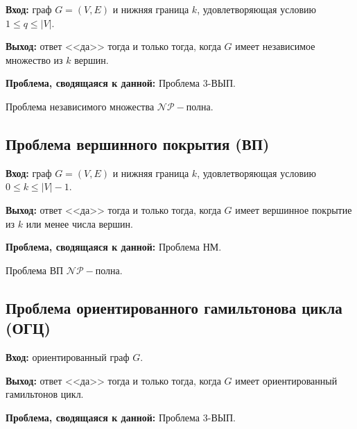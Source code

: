 \textbf{Вход:} граф $G=(V, E)$ и нижняя граница $k$, удовлетворяющая условию $1\leq q \leq |V|$.

\textbf{Выход:} ответ <<да>> тогда и только тогда, когда $G$ имеет независимое множество из $k$ вершин.

\textbf{Проблема, сводящаяся к данной:} Проблема 3-ВЫП.

\begin{corollary}
    Проблема независимого множества $\mathscr{NP-}$полна.
\end{corollary}

\subsection*{Проблема вершинного покрытия (ВП)}
\textbf{Вход:} граф $G=(V,E)$ и нижняя граница $k$, удовлетворяющая условию $0\leq k\leq |V|-1$.

\textbf{Выход:} ответ <<да>> тогда и только тогда, когда $G$ имеет вершинное покрытие из $k$ или менее числа вершин.

\textbf{Проблема, сводящаяся к данной:} Проблема НМ.

\begin{corollary}
    Проблема ВП $\mathscr{NP-}$полна.
\end{corollary}

\subsection*{Проблема ориентированного гамильтонова цикла (ОГЦ)}
\textbf{Вход:} ориентированный граф $G$.

\textbf{Выход:} ответ <<да>> тогда и только тогда, когда $G$ имеет ориентированный гамильтонов цикл.

\textbf{Проблема, сводящаяся к данной:} Проблема 3-ВЫП.

